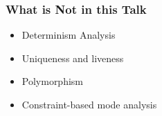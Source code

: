 \documentclass{beamer}
\begin{document}
\begin{frame}[fragile]
  \frametitle{What is Not in this Talk}
\begin{itemize}
  \item Determinism Analysis
  \item Uniqueness and liveness
  \item Polymorphism
  \item Constraint-based mode analysis
\end{itemize}

\end{frame}
\end{document}
